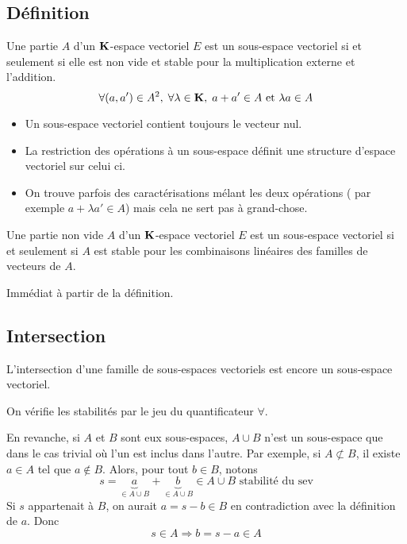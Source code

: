 \subsection{Définition}
\begin{defi}
  Une partie $A$ d'un $\mathbf{K}$-espace vectoriel $E$ est un sous-espace vectoriel si et seulement si elle est non vide et stable pour la multiplication externe et l'addition.
\begin{displaymath}
  \forall (a,a')\in A^2,\; \forall \lambda \in \mathbf{K},\; a+a'\in A\text{ et } \lambda a \in A
\end{displaymath}
\end{defi}
\begin{rems}
\begin{itemize}
  \item Un sous-espace vectoriel contient toujours le vecteur nul.
  \item La restriction des opérations à un sous-espace définit une structure d'espace vectoriel sur celui ci.
  \item On trouve parfois des caractérisations mélant les deux opérations ( par exemple $a+\lambda a' \in A$) mais cela ne sert pas à grand-chose.
\end{itemize}
\end{rems}

\begin{prop}
  Une partie non vide $A$ d'un $\mathbf{K}$-espace vectoriel $E$ est un sous-espace vectoriel si et seulement si $A$ est stable pour les combinaisons linéaires des familles de vecteurs de $A$.
\end{prop}
\begin{demo}
  Immédiat à partir de la définition.
\end{demo}


\subsection{Intersection}
\begin{prop}
  L'intersection d'une famille de sous-espaces vectoriels est encore un sous-espace vectoriel.
\end{prop}
\begin{demo}
  On vérifie les stabilités par le jeu du quantificateur $\forall$.
\end{demo}
\begin{rem}
  En revanche, si $A$ et $B$ sont eux sous-espaces, $A\cup B$ n'est un sous-espace que dans le cas trivial où l'un est inclus dans l'autre. Par exemple, si $A\not \subset B$, il existe $a\in A$ tel que $a\notin B$. Alors, pour tout $b\in B$, notons 
\begin{displaymath}
  s = \underset{\in A\cup B}{\underbrace{a}} + \underset{\in A\cup B}{\underbrace{b}} \in A\cup B \text{ stabilité du sev}
\end{displaymath}
Si $s$ appartenait à $B$, on aurait $a =s - b\in B$ en contradiction avec la définition de $a$. Donc 
\begin{displaymath}
  s\in A \Rightarrow b = s - a \in A
\end{displaymath}
\end{rem}


